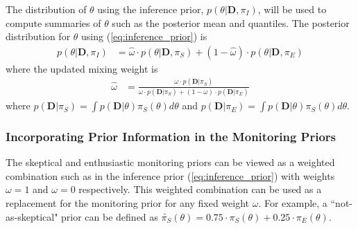 \documentclass[12pt]{article}
\begin{document}
The distribution of $\theta$ using the inference 
prior, $p(\theta|\mathbf{D},\pi_I)$, will be used to compute summaries of $\theta$ such as the posterior mean and quantiles. The posterior distribution for $\theta$ using (\ref{eq:inference_prior}) is
\begin{align}
p(\theta|\mathbf{D},\pi_I)&=\hat{\omega}\cdot p(\theta|\mathbf{D},\pi_S)+(1-\hat{\omega})\cdot p(\theta|\mathbf{D},\pi_E)
\end{align}
where the updated mixing weight is
\begin{align}
\hat{\omega}&=\frac{\omega\cdot p(\mathbf{D}|\pi_S)}{\omega\cdot p(\mathbf{D}|\pi_S)+(1-\omega)\cdot p(\mathbf{D}|\pi_E)}
\end{align}
where $p(\mathbf{D}|\pi_S)=\int p(\mathbf{D}|\theta)\pi_S(\theta)d\theta$ and $p(\mathbf{D}|\pi_E)=\int p(\mathbf{D}|\theta)\pi_S(\theta)d\theta$. 

%

\subsubsection{Incorporating Prior Information in the Monitoring Priors}
The skeptical and enthusiastic monitoring priors can be viewed as a weighted combination such as in the inference prior (\ref{eq:inference_prior}) with weights $\omega=1$ and $\omega=0$ respectively. This weighted combination can be used as a replacement for the monitoring prior for any fixed weight $\omega$. For example, a ``not-as-skeptical" prior can be defined as $\tilde{\pi_S}(\theta)=0.75\cdot\pi_S(\theta)+0.25\cdot\pi_E(\theta)$. 
\end{document}

